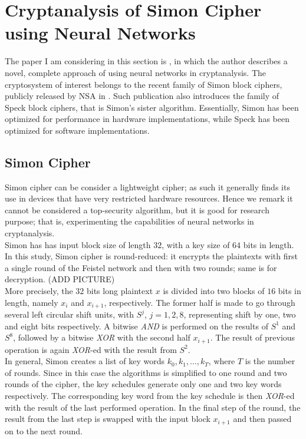 \documentclass[%
    corpo=11pt,
    twoside,
    stile=classica,
    oldstyle,
    autoretitolo,
    tipotesi=magistrale,
    greek,
    evenboxes,
    english
]{toptesi}
\begin{document}
\section{Cryptanalysis of Simon Cipher using Neural Networks}
The paper I am considering in this section is \cite{jay}, in which the author describes a novel, complete approach of using neural networks in cryptanalysis. The cryptosystem of interest belongs to the recent family of Simon block ciphers, publicly released by NSA in \cite{nsa}. Such publication also introduces the family of Speck block ciphers, that is Simon's sister algorithm. Essentially, Simon has been optimized for performance in hardware implementations, while Speck has been optimized for software implementations.
\subsection{Simon Cipher}
Simon cipher can be consider a lightweight cipher; as such it generally finds its use in devices that have very restricted hardware resources. Hence we remark it cannot be considered a top-security algorithm, but it is good for research purpose; that is, experimenting the capabilities of neural networks in cryptanalysis. \\
Simon has has input block size of length $32$, with a key size of $64$ bits in length. In this study, Simon cipher is round-reduced: it encrypts the plaintexts with first a single round of the Feistel network and then with two rounds; same is for decryption. (ADD PICTURE)\\
More precisely, the $32$ bits long plaintext $x$ is divided into two blocks of $16$ bits in length, namely $x_i$ and $x_{i+1}$, respectively. The former half is made to go through several left circular shift units, with $S^j$, $j = 1,2,8$, representing shift by one, two and eight bits respectively. A bitwise \textit{AND} is performed on the results of $S^1$ and $S^8$, followed by a bitwise \textit{XOR} with the second half $x_{i+1}$. The result of previous operation is again \textit{XOR}-ed with the result from $S^2$. \\
In general, Simon creates a list of key words $k_0, k_1, \dots, k_T$, where $T$ is the number of rounds. Since in this case the algorithms is simplified to one round and two rounds of the cipher, the key schedules generate only one and two key words respectively. The corresponding key word from the key schedule is then \textit{XOR}-ed with the result of the last performed operation. In the final step of the round, the result from the last step is swapped with the input block $x_{i+1}$ and then passed on to the next round.
\end{document}

